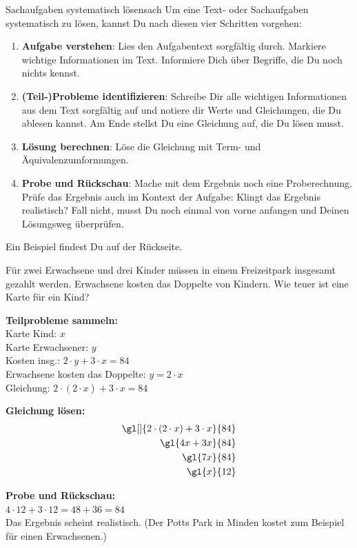 \documentclass[12pt,a5paper,landscape]{scrartcl}
\begin{document}
\begin{hilfekarte}{Sachaufgaben systematisch lösen}{sach}
Um eine Text- oder Sachaufgaben systematisch zu lösen, kannst Du nach diesen vier Schritten vorgehen:
\begin{enumerate}
	\item \textbf{Aufgabe verstehen}: Lies den Aufgabentext sorgfältig durch. Markiere wichtige Informationen im Text. Informiere Dich über Begriffe, die Du noch nichts kennst.
	\item \textbf{(Teil-)Probleme identifizieren}: Schreibe Dir alle wichtigen Informationen aus dem Text sorgfältig auf und notiere dir Werte und Gleichungen, die Du ablesen kannst. Am Ende stellst Du eine Gleichung auf, die Du lösen musst.
	\item \textbf{Lösung berechnen}: Löse die Gleichung mit Term- und Äquivalenzumformungen.
	\item \textbf{Probe und Rückschau}: Mache mit dem Ergebnis noch eine Proberechnung. Prüfe das Ergebnis auch im Kontext der Aufgabe: Klingt das Ergebnis realistisch? Fall nicht, musst Du noch einmal von vorne anfangen und Deinen Lösungsweg überprüfen.
\end{enumerate}

Ein Beispiel findest Du auf der Rückseite.
\end{hilfekarte}

\begin{loesungskarte}
\begin{rahmen}
	Für \textcolor{\lsgFarbe}{zwei Erwachsene} und \textcolor{\lsgFarbe}{drei Kinder} müssen in einem Freizeitpark insgesamt \textcolor{\lsgFarbe}{} gezahlt werden. \textcolor{\lsgFarbe}{Erwachsene kosten das Doppelte von Kindern.} Wie teuer ist eine Karte für ein Kind?
\end{rahmen}
	
\begin{multicols}{2}
	\textbf{Teilprobleme sammeln:} \\
	Karte Kind: $x$ \\
	Karte Erwachsener: $y$ \\
	Kosten insg.: $2\cdot y + 3\cdot x = 84$ \\
	Erwachsene kosten das Doppelte: $y = 2\cdot x$ \\
	Gleichung: $2\cdot (2\cdot x) + 3\cdot x = 84$
	
	\columnbreak
	\textbf{Gleichung lösen:}
	\begin{alignat*}{3}
		\gl[]{2\cdot (2\cdot x) + 3\cdot x}{84} \\
		\gl{4x + 3x}{84} \\
		\gl{7x}{84} \\
		\gl{x}{12}
	\end{alignat*}
\end{multicols}

\textbf{Probe und Rückschau:} \\
$4\cdot 12 + 3\cdot 12 = 48 + 36 = 84$ \checkmark\\[5mm]
Das Ergebnis scheint realistisch. (Der Potts Park in Minden kostet zum Beispiel  für einen Erwachsenen.)
\end{loesungskarte}
\end{document}
